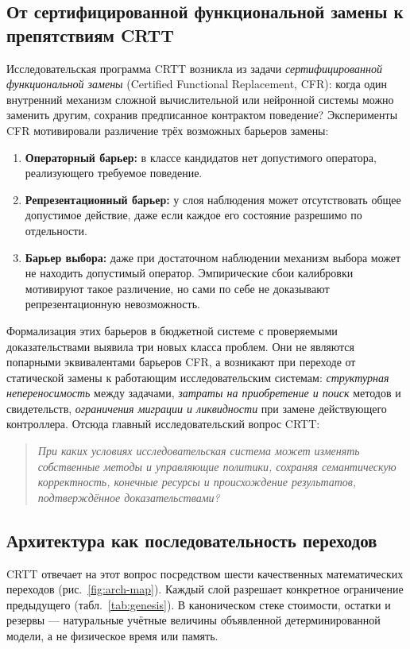 \subsection{От сертифицированной функциональной замены к препятствиям CRTT}
Исследовательская программа CRTT возникла из задачи \emph{сертифицированной функциональной замены} (Certified Functional Replacement, CFR): когда один внутренний механизм сложной вычислительной или нейронной системы можно заменить другим, сохранив предписанное контрактом поведение? Эксперименты CFR мотивировали различение трёх возможных барьеров замены:
\begin{enumerate}
    \item \textbf{Операторный барьер:} в классе кандидатов нет допустимого оператора, реализующего требуемое поведение.
    \item \textbf{Репрезентационный барьер:} у слоя наблюдения может отсутствовать общее допустимое действие, даже если каждое его состояние разрешимо по отдельности.
    \item \textbf{Барьер выбора:} даже при достаточном наблюдении механизм выбора может не находить допустимый оператор. Эмпирические сбои калибровки мотивируют такое различение, но сами по себе не доказывают репрезентационную невозможность.
\end{enumerate}

Формализация этих барьеров в бюджетной системе с проверяемыми доказательствами выявила три новых класса проблем. Они не являются попарными эквивалентами барьеров CFR, а возникают при переходе от статической замены к работающим исследовательским системам: \emph{структурная непереносимость} между задачами, \emph{затраты на приобретение и поиск} методов и свидетельств, \emph{ограничения миграции и ликвидности} при замене действующего контроллера. Отсюда главный исследовательский вопрос CRTT:
\begin{quote}
\emph{При каких условиях исследовательская система может изменять собственные методы и управляющие политики, сохраняя семантическую корректность, конечные ресурсы и происхождение результатов, подтверждённое доказательствами?}
\end{quote}

\subsection{Архитектура как последовательность переходов}
CRTT отвечает на этот вопрос посредством шести качественных математических переходов (рис.~\ref{fig:arch-map}). Каждый слой разрешает конкретное ограничение предыдущего (табл.~\ref{tab:genesis}). В каноническом стеке стоимости, остатки и резервы --- натуральные учётные величины объявленной детерминированной модели, а не физическое время или память.

